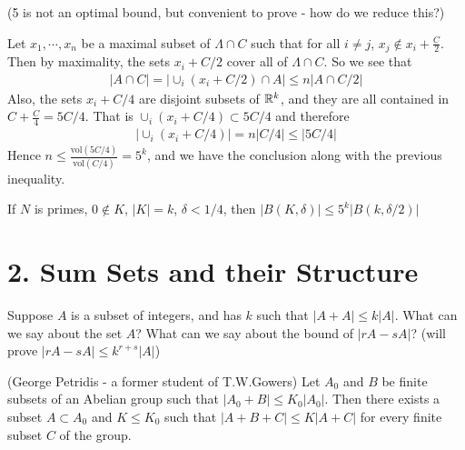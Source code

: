 \documentclass[10pt,a4paper]{report}
\newenvironment{proof}
{\begin{changemargin}{1cm}{0.5cm}
	}%
	{\end{changemargin}
}
\begin{document}
(5 is not an optimal bound, but convenient to prove - how do we reduce this?)
\begin{proof}
\pf Let $x_1, \cdots, x_n$ be a maximal subset of $\Lambda \cap C$ such that for all $i \neq j$, $x_j \notin x_i + \frac{C}{2}$. Then by maximality, the sets $x_i + C/2$ cover all of $\Lambda \cap C$. So we see that
\begin{align*}
|A \cap C|  = \big| \cup_i (x_i + C/2) \cap A \big| \leq n \big|A \cap C/2 \big|
\end{align*}
Also, the sets $x_i + C/4$ are disjoint subsets of $\mathbb{R}^k$, and they are all contained in $C + \frac{C}{4} = 5C/4$. That is $\cup_i (x_i + C/4) \subset 5C/4$ and therefore
\begin{align*}
\big| \cup_i (x_i + C/4) \big| = n \big| C/4 \big| \leq \big| 5C/4 \big|
\end{align*}
Hence $n \leq \frac{\text{vol}(5C/4)}{\text{vol}(C/4)} = 5^k$, and we have the conclusion along with the previous inequality.
\end{proof}
\s

 If $N$ is primes, $0\notin K$, $|K| =k$, $\delta <1/4$, then $|B(K,\delta)| \leq 5^k |B(k,\delta/2)|$
\s

\section*{2. Sum Sets and their Structure}

Suppose $A$ is a subset of integers, and has $k$ such that $|A+A | \leq k|A|$. What can we say about the set $A$? What can we say about the bound of $|rA-sA|$? (will prove $|rA-sA| \leq k^{r+s}|A|$)
\s

 (George Petridis - a former student of T.W.Gowers) Let $A_0$ and $B$ be finite subsets of an Abelian group such that $|A_0 + B | \leq K_0 |A_0| $. Then there exists a subset $A\subset A_0$ and $K\leq K_0$ such that $|A+B+C|\leq K|A+C|$ for every finite subset $C$ of the group.
\s
\end{document}
